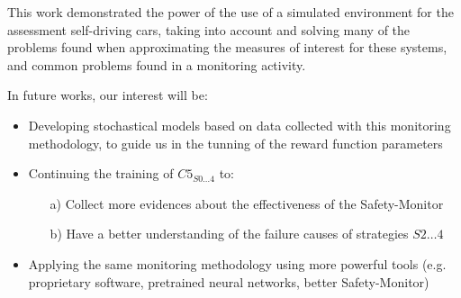 This work demonstrated the power of the use of a simulated environment for the assessment self-driving cars, taking into account and solving many of the problems found when approximating the measures of interest for these systems, and common problems found in a monitoring activity.

In future works, our interest will be:

\begin{itemize}
	\item Developing stochastical models based on data collected with this monitoring methodology, to guide us in the tunning of the reward function parameters
	\item Continuing the training of $C5_{S0\dots 4}$ to:
	\begin{itemize}
		\item[a)] Collect more evidences about the effectiveness of the Safety-Monitor
		\item[b)] Have a better understanding of the failure causes of strategies $S2\dots 4$
	\end{itemize}
	\item Applying the same monitoring methodology using more powerful tools (e.g. proprietary software, pretrained neural networks, better Safety-Monitor)
\end{itemize}
